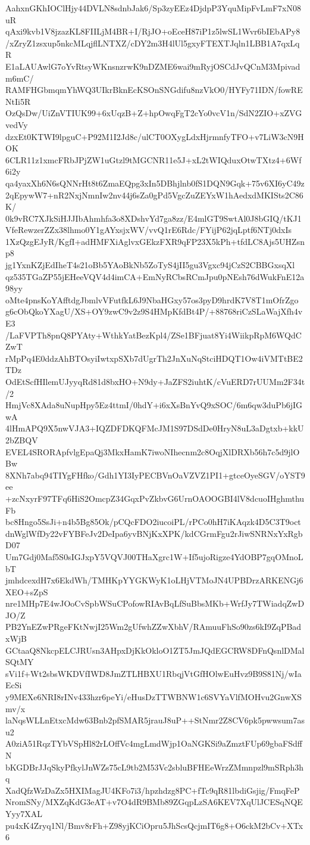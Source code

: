 AahxnGKhIOClHjy44DVLN8sdnbJak6/Sp3zyEEz4DjdpP3YquMipFvLmF7xN08uR
qAxi9kvb1V8jzazKL8FIILjM4BR+I/RjJO+oEceH87iP1z5lwSL1Wvr6bIEbAPy8
/xZryZ1zsxup5nkcMLqjflLNTXZ/cDY2m3H4lUl5gxyFTEXTJqln1LBB1A7qxLqR
E1aLAUAwlG7oYvRtsyWKnsnzrwK9nDZME6wai9mRyjOSCdJvQCnM3Mpivadm6mC/
RAMFHGbmqmYhWQ3UIkrBknEcKSOnSNGdifu8nzVkO0/HYFy71IDN/fowRENtIi5R
OzQsDw/UiZnVTIUK99+6xUqzB+Z+hpOwqFgT2cYo0vcV1n/SdN2ZIO+xZVGvedVy
dzxEt0KTWI9lpguC+P92M1I2Jd8c/ulCT0OXygLdxHjrmnfyTFO+v7LiW3cN9HOK
6CLR11z1xmcFRbJPjZW1uGtzl9tMGCNR11e5J+xL2tWIQduxOtwTXtz4+6Wf6i2y
qa4yaxXh6N6sQNNrHt8t6ZmaEQpg3xIn5DBhjlnb0fS1DQN9Gqk+75v6XI6yC49z
2qEpywW7+nR2NxjNmnIw2nv44j6sZa0gPd5VgcZuZEYxW1hAedxdMKISts2C86K/
0k9vRC7XJkSiHJJIbAhmhfa3o8XDshvYd7ga8zz/E4mlGT9SwtAl0J8bGIQ/tKJ1
VfeRewzerZZx38lhmo0Y1gAYxsjxWV/vvQ1rE6Rdc/FYijP62jqLptf6NTj0dxIs
1XzQzgEJyR/KgfI+adHMFXiAglvxGEkzFXR9qFP23X5kPh+tfdLC8Ajs5UHZsnp8
jg1YxnKZjEdIheT4s21oBb5YAoBkNb5ZoTyS4jII5gu3Vgxc94jCzS2CBBGxsqXl
qz535TGaZP55jEHeeVQV4d4imCA+EmNyRCbsRCmJpu0pNEsh76dWukFnE12a98yy
oMte4pnsKoYAfftdgJbmlvVFutfkL6J9NbaHGxy57os3pyD9hrdK7V8T1mOfrZgo
g6cObQkoYXagU/XS+OY9zwC9v2z9S4HMpKfdBt4P/+88768riCzSLaWajXfh4vE3
/LaFVPTh8pnQ8PYAty+WthkYatBezKpl4/ZSe1BFjuat8Yi4WiikpRpM6WQdCZwT
rMpPq4E0ddzAhBTOsyiIwtxpSXb7dUgrTh2JnXuNqStciHDQT1Ow4iVMTtBE2TDz
OdEtScfHIlemUJyyqRd81d8bxHO+N9dy+JaZFS2iuhtK/cVuERD7rUUMm2F34t/2
HmjVc8XAda8uNupHpy5Ez4ttmI/0hdY+i6xXsBnYvQ9xSOC/6m6qw3duPb6jIGwA
4lHmAPQ9X5nwVJA3+IQZDFDKQFMcJM1S97DSdDe0HryN8uL3aDgtxb+kkU2bZBQV
EVEL4SRORApfvlgEpaQj3MkxHamK7iwoNIhecnm2c8OqjXlDRXb56h7c5d9jlOBw
8XNh7abq94TIYgFHfko/Gdh1YI3IyPECBVnOaVZVZ1PI1+gtceOyeSGV/oYST9ee
+zcNxyrF97TFq6HiS2OmcpZ34GqxPvZkbvG6UrnOAOOGBI4lV8dcuoIHghmthuFb
bc8Hngo5SsJi+n4b5Bg85Ok/pCQcFDO2iucoiPL/rPCo0hH7iKAqzk4D5C3T9oct
dnWglWfDy22vFYBFeJv2DeIpa6yvBNjKxXPK/kdCGrmFgu2rJiwSNRNxYxRgbD07
Um7Gdj0Maf5S0sIGJxpY5VQVJ00THaXgrc1W+If5ujoRigze4YdOBP7gqOMnoLbT
jmhdcexdH7x6EkdWh/TMHKpYYGKWyK1oLHjVTMoJN4UPBDrzARKENGj6XEO+sZpS
nre1MHp7E4wJOoCvSpbWSuCPofowRIAvBqLfSuBbsMKb+WrfJy7TWiadqZwDJO/Z
PB2YnEZwPRgeFKtNwjI25Wm2gUfwhZZwXbhV/RAmuuFhSo90zs6kI9ZqPBadxWjB
GCtaaQ8NkcpELCJRUsn3AHpxDjKkOkloO1ZT5JmJQdEGCRW8DFnQsnlDMalSQtMY
sVi1f+Wt2sbsWKDVfIWD8JmZTLHBXU1RbqjVtGfHOlwEuHvz9B9S81Nj/wIaEcSi
y9MEXe6NRI8rINv433hzr6peYi/eHusDzTTWBNW1c6SVYaVlfMOHvu2GnwXSmv/x
laNqsWLLnEtxcMdw63Bnb2pfSMAR5jrauJ8uP++StNmr2Z8CV6pk5pwwsum7asu2
A0ziA51RqzTYbVSpHl82rLOffVc4mgLmdWjp1OaNGKSi9aZmztFUp69gbaFSdffN
bKGDBrJJqSkyPfkylJnWZs75cL9tb2M53Vc2sbluBFHEeWrzZMmnpzl9mSRph3hq
XadQfzWzDaZx5HXIMagJU4KFo7i3/hpzhdzg8PC+fTc9qR81lbdiGsjig/FmqFeP
NromSNy/MXZqKdG3eAT+v7O4dR9BMb89ZGqpLzSA6KEV7XqUlJCESqNQEYyy7XAL
pu4xK4Zryq1Nl/Bmv8rFh+Z98yjKCiOpru5JhScsQcjmIT6g8+O6ckM2bCv+XTx6
